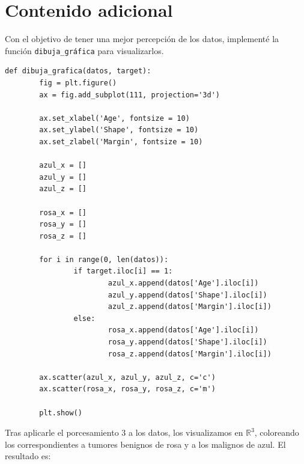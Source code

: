 \documentclass[a4]{article}
\begin{document}
 
\section{Contenido adicional}

Con el objetivo de tener una mejor percepción de los datos, implementé la función \texttt{dibuja\_gráfica} para visualizarlos.

\begin{lstlisting}
def dibuja_grafica(datos, target):
        fig = plt.figure()
        ax = fig.add_subplot(111, projection='3d')

        ax.set_xlabel('Age', fontsize = 10)
        ax.set_ylabel('Shape', fontsize = 10)
        ax.set_zlabel('Margin', fontsize = 10)

        azul_x = [] 
        azul_y = [] 
        azul_z = [] 
        
        rosa_x = [] 
        rosa_y = [] 
        rosa_z = [] 

        for i in range(0, len(datos)):
                if target.iloc[i] == 1:
                        azul_x.append(datos['Age'].iloc[i])
                        azul_y.append(datos['Shape'].iloc[i])
                        azul_z.append(datos['Margin'].iloc[i])
                else:
                        rosa_x.append(datos['Age'].iloc[i])
                        rosa_y.append(datos['Shape'].iloc[i])
                        rosa_z.append(datos['Margin'].iloc[i])

        ax.scatter(azul_x, azul_y, azul_z, c='c')
        ax.scatter(rosa_x, rosa_y, rosa_z, c='m')
        
        plt.show() 
      \end{lstlisting}

Tras aplicarle el porcesamiento $3$ a los datos, los visualizamos en $\mathbb{R}^3$, coloreando los correspondientes a tumores benignos de rosa y a los malignos de azul. El resultado es:

\begin{figure}[H]
  \centering
\end{figure}
\end{document}
